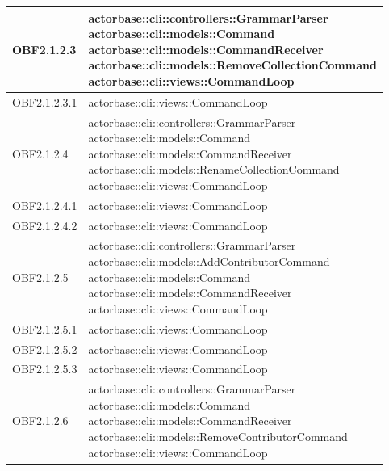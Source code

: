 \documentclass{scalatekids-article}
\begin{document}
\begin{longtable}[H]{|p{4.5cm}|p{13cm}|}
  \hline
  OBF2.1.2.3 & \multiLineCell[t]{actorbase::cli::controllers::GrammarParser\\actorbase::cli::models::Command\\actorbase::cli::models::CommandReceiver\\actorbase::cli::models::RemoveCollectionCommand\\actorbase::cli::views::CommandLoop\\}\\
  \hline
  OBF2.1.2.3.1 & \multiLineCell[t]{actorbase::cli::views::CommandLoop\\}\\
  \hline
  OBF2.1.2.4 & \multiLineCell[t]{actorbase::cli::controllers::GrammarParser\\actorbase::cli::models::Command\\actorbase::cli::models::CommandReceiver\\actorbase::cli::models::RenameCollectionCommand\\actorbase::cli::views::CommandLoop\\}\\
  \hline
  OBF2.1.2.4.1 & \multiLineCell[t]{actorbase::cli::views::CommandLoop\\}\\
  \hline
  OBF2.1.2.4.2 & \multiLineCell[t]{actorbase::cli::views::CommandLoop\\}\\
  \hline
  OBF2.1.2.5 & \multiLineCell[t]{actorbase::cli::controllers::GrammarParser\\actorbase::cli::models::AddContributorCommand\\actorbase::cli::models::Command\\actorbase::cli::models::CommandReceiver\\actorbase::cli::views::CommandLoop\\}\\
  \hline
  OBF2.1.2.5.1 & \multiLineCell[t]{actorbase::cli::views::CommandLoop\\}\\
  \hline
  OBF2.1.2.5.2 & \multiLineCell[t]{actorbase::cli::views::CommandLoop\\}\\
  \hline
  OBF2.1.2.5.3 & \multiLineCell[t]{actorbase::cli::views::CommandLoop\\}\\
  \hline
  OBF2.1.2.6 & \multiLineCell[t]{actorbase::cli::controllers::GrammarParser\\actorbase::cli::models::Command\\actorbase::cli::models::CommandReceiver\\actorbase::cli::models::RemoveContributorCommand\\actorbase::cli::views::CommandLoop\\}\\

\end{longtable}
\end{document}
